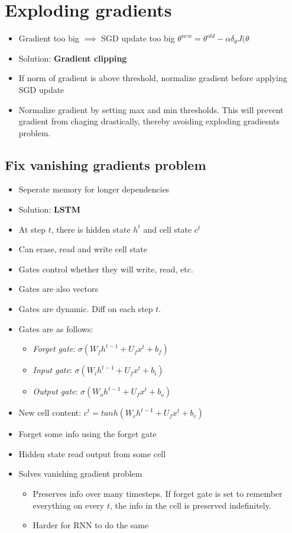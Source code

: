\documentclass[a4paper]{article}
\begin{document}
\section{Exploding gradients}
\begin{itemize}
    \item Gradient too big $\implies$ SGD update too big
        $ \theta^{new} = \theta^{old} - \alpha \delta_{\theta}J(\theta $
    \item Solution: \textbf{Gradient clipping} 
    \item If norm of gradient is above threshold, normalize gradient before applying SGD update
    \item Normalize gradient by setting max and min thresholds. This will prevent gradient from chaging drastically, thereby avoiding exploding gradiesnts problem.
\end{itemize}
\subsection{Fix vanishing gradients problem}
\begin{itemize}
    \item Seperate memory for longer dependencies
    \item Solution: \textbf{LSTM}  
    \item At step $t$, there is hidden state $h^t$ and cell state $c^t$
     \item Can erase, read and write cell state
    \item Gates control whether they will write, read, etc.
    \item Gates are also vectors
    \item Gates are dynamic. Diff on each step $t$.
    \item Gates are as follows:
    \begin{itemize}
        \item \textit{Forget gate}: $\sigma(W_fh^{t-1} + U_fx^t + b_f)$
        \item \textit{Input gate}: $\sigma(W_ih^{t-1} + U_fx^t + b_i)$
        \item \textit{Output gate}: $\sigma(W_oh^{t-1} + U_fx^t + b_o)$
    \end{itemize}
    \item New cell content: $c^t = tanh(W_ch^{t-1} + U_fx^t + b_c)$
    \item Forget some info using the forget gate
    \item Hidden state read output from some cell
    \item Solves vanishing gradient problem
    \begin{itemize}
        \item Preserves info over many timesteps. If forget gate is set to remember everything on every $t$, the info in the cell is preserved indefinitely.
        \item Harder for RNN to do the same
    \end{itemize}
\end{itemize}
\end{document}
